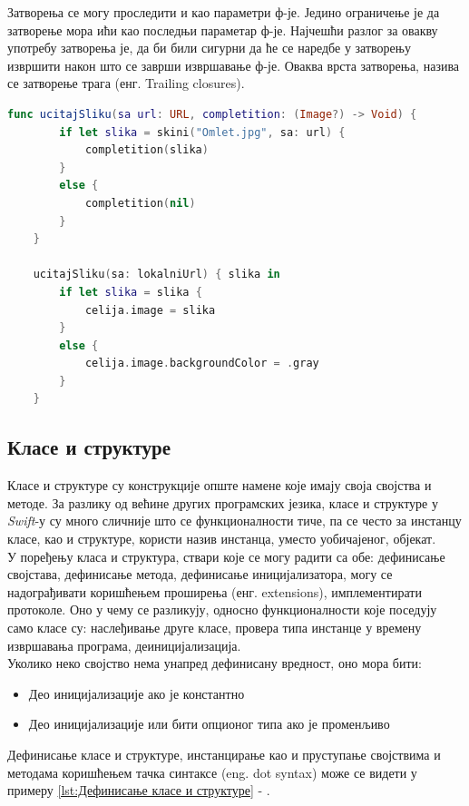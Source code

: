 \documentclass[12pt,oneside]{memoir}
\begin{document}
\indent Затворења се могу проследити и као параметри ф-је. Једино ограничење је да затворење мора ићи као последњи параметар ф-је. Најчешћи разлог за овакву употребу затворења је, да би били сигурни да ће се наредбе у затворењу извршити након што се заврши извршавање ф-је. Оваква врста затворења, назива се затворење трага (енг. Trailing closures). 

\begin{lstlisting}[caption=\textit{{Затворење трага}}, label={lst:Затворење трага}, language=Swift, frame=single]
    func ucitajSliku(sa url: URL, completition: (Image?) -> Void) {
        if let slika = skini("Omlet.jpg", sa: url) {
            completition(slika)
        }
        else {
            completition(nil)
        }
    }
    
    ucitajSliku(sa: lokalniUrl) { slika in
        if let slika = slika {
            celija.image = slika
        }
        else {
            celija.image.backgroundColor = .gray
        }
    }
\end{lstlisting}

\subsection{Класе и структуре}

\indent Класе и структуре су конструкције опште намене које имају своја својства и методе. За разлику од већине других програмских језика, класе и структуре у \textit{Swift}-у су много сличније што се функционалности тиче, па се често за инстанцу класе, као и структуре, користи назив инстанца, уместо уобичајеног, објекат. 
\\
\indent У поређењу класа и структура, ствари које се могу радити са обе: дефинисање својстава, дефинисање метода, дефинисање иницијализатора, могу се надограђивати коришћењем проширења (енг. extensions), имплементирати протоколе. 
Оно у чему се разликују, односно функционалности које поседују само класе су: наслеђивање друге класе, провера типа инстанце у времену извршавања програма, деиницијализација.
\\
\indent Уколико неко својство нема унапред дефинисану вредност, оно мора бити: 
\begin{itemize}
    \item Део иницијализације ако је константно 
    \item Део иницијализације или бити опционог типа ако је променљиво 
\end{itemize}
\indent Дефинисање класе и структуре, инстанцирање као и пруступање својствима и методама коришћењем тачка синтаксе (eng. dot syntax) може се видети у примеру \ref{lst:Дефинисање класе и структуре} - .
\end{document}
